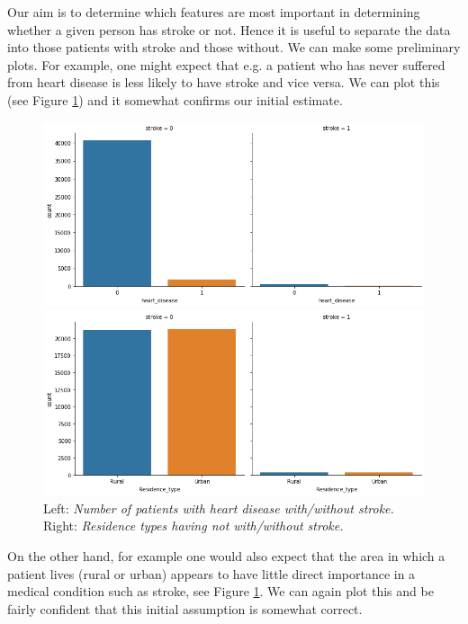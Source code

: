 \documentclass[10pt]{article}
\begin{document}
Our aim is to determine which features are most important in determining whether a given person has stroke or not. Hence it is useful to separate the data into those patients with stroke and those without. We can make some preliminary plots. For example, one might expect that e.g. a patient who has never suffered from heart disease is less likely to have stroke and vice versa. We can plot this (see Figure \ref{fig1}) and it somewhat confirms our initial estimate.
\begin{figure}[h!]
\centering  
\begin{minipage}[b]{0.45\textwidth}
    \includegraphics[width=\textwidth]{index.png}
  \end{minipage}
  \hfill
  \begin{minipage}[b]{0.45\textwidth}
    \includegraphics[width=\textwidth]{index2.png}
  \end{minipage}
\caption{Left: \textit{Number of patients with heart disease with/without stroke.} Right: \textit{Residence types having not with/without stroke.}}
\label{fig1}
\end{figure}
On the other hand, for example one would also expect that the area in which a patient lives (rural or urban) appears to have little direct importance in a medical condition such as stroke, see Figure \ref{fig1}. We can again plot this and be fairly confident that this initial assumption is somewhat correct.
\end{document}
